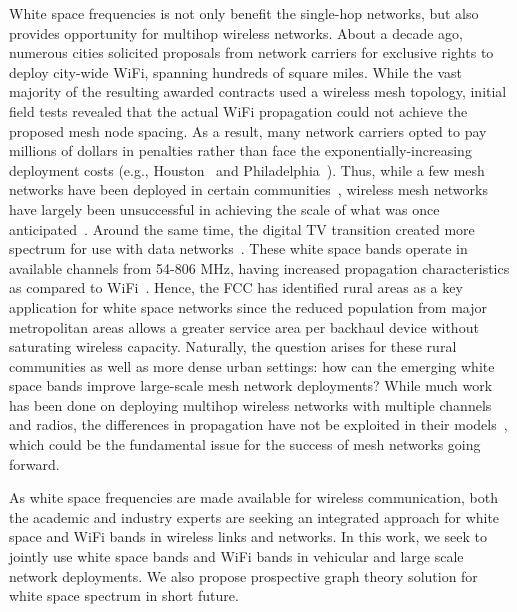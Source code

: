 White space frequencies is not only benefit the single-hop networks, but also provides 
opportunity for multihop wireless networks. About a decade ago, numerous cities solicited 
proposals from network carriers for exclusive rights to deploy city-wide WiFi, spanning 
hundreds of square miles. While the vast majority of the resulting awarded contracts used 
a wireless mesh topology, initial field tests revealed that the actual WiFi propagation 
could not achieve the proposed mesh node spacing. As a result, many network carriers opted 
to pay millions of dollars in penalties rather than face the exponentially-increasing 
deployment costs (e.g., Houston~\cite{cnet_aug07} and Philadelphia~\cite{arstechnica_may08}). 
Thus, while a few mesh networks have been deployed in certain communities~\cite{CRSK06,google_imc08}, 
wireless mesh networks have largely been unsuccessful in achieving the scale of what was 
once anticipated~\cite{taps}. Around the same time, the digital TV transition created more 
spectrum for use with data networks~\cite{fccwhitespace}. These white space bands operate in 
available channels from 54-806 MHz, having increased propagation characteristics as compared 
to WiFi~\cite{balanis2012antenna}. Hence, the FCC has identified rural areas as a key 
application for white space networks since the reduced population from major metropolitan 
areas allows a greater service area per backhaul device without saturating wireless capacity. 
Naturally, the question arises for these rural communities as well as more dense urban 
settings: how can the emerging white space bands improve large-scale mesh network deployments?  
While much work has been done on deploying multihop wireless networks with multiple channels 
and radios, the differences in propagation have not be exploited in their models~\cite{raniwala2004centralized,tang2005interference, si2010overview}, 
which could be the fundamental issue for the success of mesh networks going forward.

As white space frequencies are made available for wireless communication, both the academic 
and industry experts are seeking an integrated approach for white space and WiFi bands in 
wireless links and networks. In this work, we seek to jointly use white space bands and WiFi 
bands in vehicular and large scale network deployments. We also propose prospective graph 
theory solution for white space spectrum in short future. 



